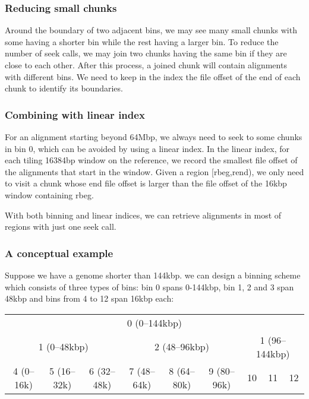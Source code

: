 \documentclass[10pt]{article}
\begin{document}
\subsubsection{Reducing small chunks}
Around the boundary of two adjacent bins, we may see many small chunks
with some having a shorter bin while the rest having a larger bin. To
reduce the number of seek calls, we may join two chunks having the same
bin if they are close to each other. After this process, a joined chunk
will contain alignments with different bins. We need to keep in the
index the file offset of the end of each chunk to identify its
boundaries.

\subsubsection{Combining with linear index}
For an alignment starting beyond 64Mbp, we always need to seek to some
chunks in bin 0, which can be avoided by using a linear index. In the
linear index, for each tiling 16384bp window on the reference, we record
the smallest file offset of the alignments that start in the
window. Given a region [rbeg,rend), we only need to visit a chunk whose
end file offset is larger than the file offset of the 16kbp window
containing rbeg.

With both binning and linear indices, we can retrieve alignments in most
of regions with just one seek call.

\subsubsection{A conceptual example}
Suppose we have a genome shorter than 144kbp. we can design a binning
scheme which consists of three types of bins: bin 0 spans 0-144kbp, bin
1, 2 and 3 span 48kbp and bins from 4 to 12 span 16kbp each:

\begin{table}[h]
  \centering
  {\small\begin{tabular}{|c|c|c|c|c|c|c|c|c|}
    \cline{1-9}
    \multicolumn{9}{|c|}{0 (0--144kbp)}\\\cline{1-9}
    \multicolumn{3}{|c|}{1 (0--48kbp)} & \multicolumn{3}{c|}{2 (48--96kbp)} & \multicolumn{3}{c|}{1 (96--144kbp)} \\\cline{1-9}
    4 (0--16k) & 5 (16--32k) & 6 (32--48k) & 7 (48--64k) & 8 (64--80k) & 9 (80--96k) & 10 & 11 & 12 \\
    \cline{1-9}
  \end{tabular}}
\end{table}
\end{document}

